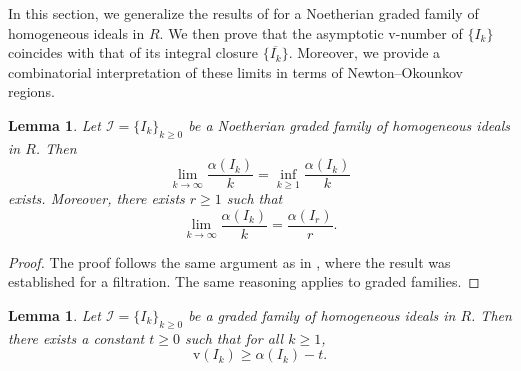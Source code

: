 \documentclass[11pt,reqno,a4paper]{amsart}
\newtheorem{lemma}[theorem]{Lemma}
\theoremstyle{definition}
\begin{document}
In this section, we generalize the results of \cite[Lemma 3.3, Lemma 3.4, Theorem 3.5]{KumarNanduriSaha25} for a Noetherian graded family of homogeneous ideals in $R$.
 We then prove that the asymptotic $\mathrm{v}$-number of $\{I_k\}$ coincides with that of its integral closure $\{\overline{I_k}\}$. Moreover, we provide a combinatorial interpretation of these limits in terms of Newton–Okounkov regions.

\begin{lemma}
Let $\mathcal{I} = \{I_k\}_{k \ge 0}$ be a Noetherian graded family of homogeneous ideals in $R$. Then
\[
\lim_{k \to \infty} \frac{\alpha(I_k)}{k} 
= \inf_{k \ge 1} \frac{\alpha(I_k)}{k}
\]
exists. Moreover, there exists $r \ge 1$ such that
\[
\lim_{k \to \infty} \frac{\alpha(I_k)}{k} = \frac{\alpha(I_r)}{r}.
\]
\end{lemma}

\begin{proof}

The proof follows the same argument as in \cite[Page 7]{VanmathiSarkar25}, where the result was established for a filtration. The same reasoning applies to graded families.



\end{proof}



\begin{lemma}\label{lemma 1.2.}
Let $\mathcal{I} =\{I_k\}_{k \ge 0}$ be a graded family of homogeneous ideals in $R$. 
Then there exists a constant $t \geq 0$ such that for all $k \geq 1$,
\[
\mathrm{v}(I_k) \geq \alpha(I_k) - t.
\]
\end{lemma}
\end{document}
